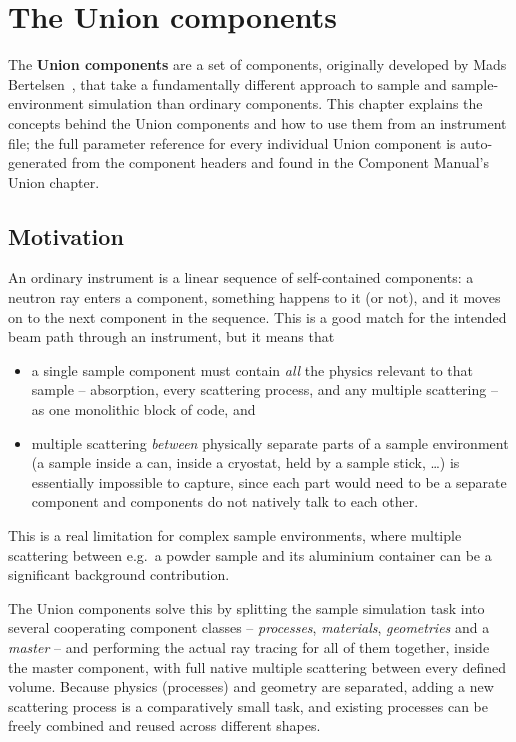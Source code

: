 \chapter{The Union components}
\label{c:union}

\providecommand{\Vset}{\mathcal{V}}

The \textbf{Union components} are a set of \MCS components, originally developed
by Mads Bertelsen~\cite{union_thesis,union_paper}, that take a fundamentally
different approach to sample and sample-environment simulation than ordinary
\MCS components. This chapter explains the concepts behind the Union
components and how to use them from an instrument file; the full parameter
reference for every individual Union component is auto-generated from the
component headers and found in the Component Manual's Union chapter.

\section{Motivation}
\label{sec:union-motivation}

An ordinary \MCS instrument is a linear sequence of self-contained
components: a neutron ray enters a component, something happens to it (or
not), and it moves on to the next component in the sequence. This is a good
match for the intended beam path through an instrument, but it means that
\begin{itemize}
\item a single sample component must contain \emph{all} the physics relevant
  to that sample -- absorption, every scattering process, and any multiple
  scattering -- as one monolithic block of code, and
\item multiple scattering \emph{between} physically separate parts of a
  sample environment (a sample inside a can, inside a cryostat, held by a
  sample stick, \ldots) is essentially impossible to capture, since each
  part would need to be a separate component and \MCS components do not
  natively talk to each other.
\end{itemize}
This is a real limitation for complex sample environments, where multiple
scattering between e.g.\ a powder sample and its aluminium container can be
a significant background contribution.

The Union components solve this by splitting the sample simulation task into
several cooperating component classes -- \emph{processes}, \emph{materials},
\emph{geometries} and a \emph{master} -- and performing the actual ray
tracing for all of them together, inside the master component, with full
native multiple scattering between every defined volume. Because physics
(processes) and geometry are separated, adding a new scattering process is a
comparatively small task, and existing processes can be freely combined and
reused across different shapes.

